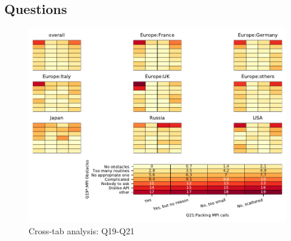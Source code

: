 
\subsection{Questions}


\begin{figure}
\begin{center}
\includegraphics[width=12cm]{../pdfs/Q19-Q21.pdf}
\caption{Cross-tab analysis: Q19-Q21}
\label{fig:Q19-Q21}
\end{center}
\end{figure}
